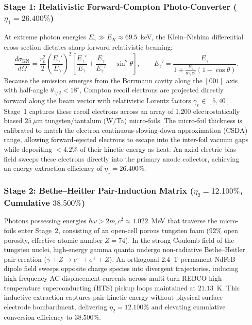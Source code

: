 \documentclass[11pt,onecolumn]{article}
\begin{document}
\subsubsection{Stage 1: Relativistic Forward-Compton Photo-Converter (\texorpdfstring{$\eta_1 = 26.400\%$}{eta1 = 26.400\%})}
At extreme photon energies $E_\gamma \gg E_K \approx 69.5$~keV, the Klein--Nishina differential cross-section dictates sharp forward relativistic beaming:
\begin{equation}
\frac{d\sigma_{\text{KN}}}{d\Omega} = \frac{r_e^2}{2}\left(\frac{E_\gamma'}{E_\gamma}\right)^2 \left[\frac{E_\gamma'}{E_\gamma} + \frac{E_\gamma}{E_\gamma'} - \sin^2\theta\right], \qquad E_\gamma' = \frac{E_\gamma}{1 + \frac{E_\gamma}{m_e c^2}(1 - \cos\theta)}.
\label{eq:klein_nishina}
\end{equation}
Because the emission emerges from the Borrmann cavity along the $[001]$ axis with half-angle $\theta_{1/2} < 18^\circ$, Compton recoil electrons are projected directly forward along the beam vector with relativistic Lorentz factors $\gamma_e \in [5, 40]$. Stage~1 captures these recoil electrons across an array of 1,200 electrostatically biased $25~\mu\text{m}$ tungsten/tantalum (W/Ta) micro-foils. The micro-foil thickness is calibrated to match the electron continuous-slowing-down approximation (CSDA) range, allowing forward-ejected electrons to escape into the inter-foil vacuum gaps while depositing $<4.2\%$ of their kinetic energy as heat. An axial electric bias field sweeps these electrons directly into the primary anode collector, achieving an energy extraction efficiency of $\eta_1 = 26.400\%$.

\FloatBarrier
\subsubsection{Stage 2: Bethe--Heitler Pair-Induction Matrix (\texorpdfstring{$\eta_2 = 12.100\%$}{eta2 = 12.100\%}, Cumulative \texorpdfstring{$38.500\%$}{38.500\%})}
Photons possessing energies $\hbar\omega > 2m_e c^2 \approx 1.022$~MeV that traverse the micro-foils enter Stage~2, consisting of an open-cell porous tungsten foam ($92\%$ open porosity, effective atomic number $Z = 74$). In the strong Coulomb field of the tungsten nuclei, high-energy gamma quanta undergo non-radiative Bethe--Heitler pair creation ($\gamma + Z \to e^- + e^+ + Z$). An orthogonal $2.4$~T permanent NdFeB dipole field sweeps opposite charge species into divergent trajectories, inducing high-frequency AC displacement currents across multi-turn REBCO high-temperature superconducting (HTS) pickup loops maintained at $21.13$~K. This inductive extraction captures pair kinetic energy without physical surface electrode bombardment, delivering $\eta_2 = 12.100\%$ and elevating cumulative conversion efficiency to $38.500\%$.
\end{document}
